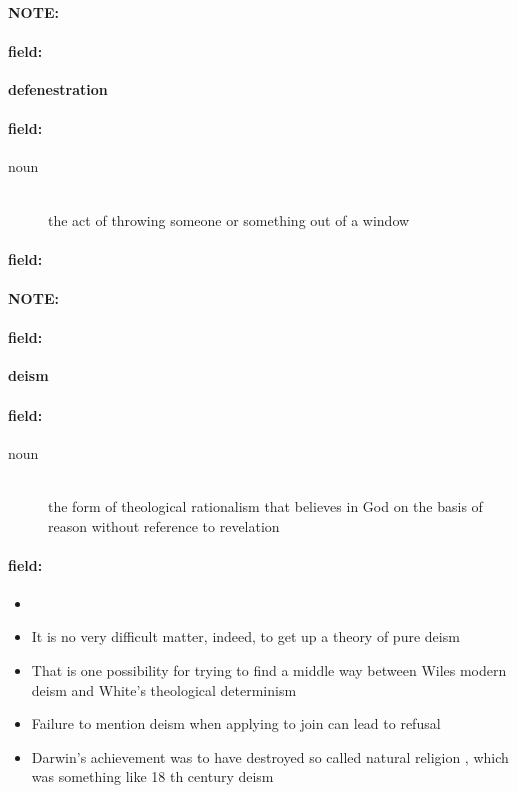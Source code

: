 \documentclass[12pt]{article}
\newenvironment{note}{\paragraph{NOTE:}}{}
\newenvironment{field}{\paragraph{field:}}{}
\begin{document}
\begin{note}
\begin{field}
\textbf{\large defenestration}
\end{field}


\begin{field}
\begin{description}
\item[noun] \hfill \\ 
the act of throwing someone or something out of a window

\end{description}
\end{field}

\begin{field}
\end{field}
\end{note}
\begin{note}
\begin{field}
\textbf{\large deism}
\end{field}


\begin{field}
\begin{description}
\item[noun] \hfill \\ 
the form of theological rationalism that believes in God on the basis of reason without reference to revelation

\end{description}
\end{field}

\begin{field}
\begin{itemize}
\item 
\item It is no very difficult matter, indeed, to get up a theory of pure deism
\item That is one possibility for trying to find a middle way between Wiles modern deism and White's theological determinism
\item Failure to mention deism when applying to join can lead to refusal
\item Darwin's achievement was to have destroyed so called natural religion , which was something like 18 th century deism
\end{itemize}
\end{field}
\end{note}
\end{document}
